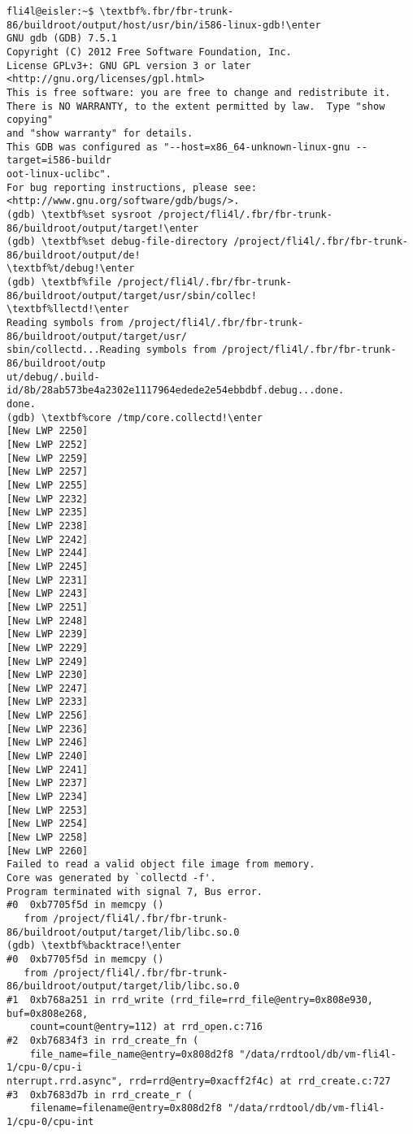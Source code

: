 \begin{example}
\begin{Verbatim}[commandchars=\\\%!]
fli4l@eisler:~$ \textbf%.fbr/fbr-trunk-86/buildroot/output/host/usr/bin/i586-linux-gdb!\enter
GNU gdb (GDB) 7.5.1
Copyright (C) 2012 Free Software Foundation, Inc.
License GPLv3+: GNU GPL version 3 or later <http://gnu.org/licenses/gpl.html>
This is free software: you are free to change and redistribute it.
There is NO WARRANTY, to the extent permitted by law.  Type "show copying"
and "show warranty" for details.
This GDB was configured as "--host=x86_64-unknown-linux-gnu --target=i586-buildr
oot-linux-uclibc".
For bug reporting instructions, please see:
<http://www.gnu.org/software/gdb/bugs/>.
(gdb) \textbf%set sysroot /project/fli4l/.fbr/fbr-trunk-86/buildroot/output/target!\enter
(gdb) \textbf%set debug-file-directory /project/fli4l/.fbr/fbr-trunk-86/buildroot/output/de!
\textbf%t/debug!\enter
(gdb) \textbf%file /project/fli4l/.fbr/fbr-trunk-86/buildroot/output/target/usr/sbin/collec!
\textbf%llectd!\enter
Reading symbols from /project/fli4l/.fbr/fbr-trunk-86/buildroot/output/target/usr/
sbin/collectd...Reading symbols from /project/fli4l/.fbr/fbr-trunk-86/buildroot/outp
ut/debug/.build-id/8b/28ab573be4a2302e1117964edede2e54ebbdbf.debug...done.
done.
(gdb) \textbf%core /tmp/core.collectd!\enter
[New LWP 2250]
[New LWP 2252]
[New LWP 2259]
[New LWP 2257]
[New LWP 2255]
[New LWP 2232]
[New LWP 2235]
[New LWP 2238]
[New LWP 2242]
[New LWP 2244]
[New LWP 2245]
[New LWP 2231]
[New LWP 2243]
[New LWP 2251]
[New LWP 2248]
[New LWP 2239]
[New LWP 2229]
[New LWP 2249]
[New LWP 2230]
[New LWP 2247]
[New LWP 2233]
[New LWP 2256]
[New LWP 2236]
[New LWP 2246]
[New LWP 2240]
[New LWP 2241]
[New LWP 2237]
[New LWP 2234]
[New LWP 2253]
[New LWP 2254]
[New LWP 2258]
[New LWP 2260]
Failed to read a valid object file image from memory.
Core was generated by `collectd -f'.
Program terminated with signal 7, Bus error.
#0  0xb7705f5d in memcpy ()
   from /project/fli4l/.fbr/fbr-trunk-86/buildroot/output/target/lib/libc.so.0
(gdb) \textbf%backtrace!\enter
#0  0xb7705f5d in memcpy ()
   from /project/fli4l/.fbr/fbr-trunk-86/buildroot/output/target/lib/libc.so.0
#1  0xb768a251 in rrd_write (rrd_file=rrd_file@entry=0x808e930, buf=0x808e268,
    count=count@entry=112) at rrd_open.c:716
#2  0xb76834f3 in rrd_create_fn (
    file_name=file_name@entry=0x808d2f8 "/data/rrdtool/db/vm-fli4l-1/cpu-0/cpu-i
nterrupt.rrd.async", rrd=rrd@entry=0xacff2f4c) at rrd_create.c:727
#3  0xb7683d7b in rrd_create_r (
    filename=filename@entry=0x808d2f8 "/data/rrdtool/db/vm-fli4l-1/cpu-0/cpu-int

\end{Verbatim}
\end{example}
